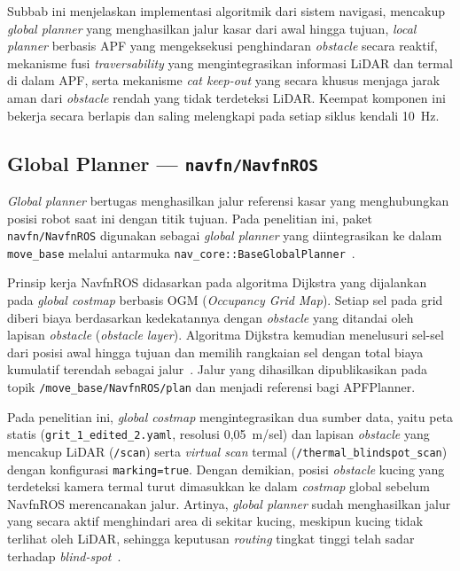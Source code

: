 Subbab ini menjelaskan implementasi algoritmik dari sistem navigasi, mencakup \textit{global planner} yang menghasilkan jalur kasar dari awal hingga tujuan, \textit{local planner} berbasis APF yang mengeksekusi penghindaran \textit{obstacle} secara reaktif, mekanisme fusi \textit{traversability} yang mengintegrasikan informasi LiDAR dan termal di dalam APF, serta mekanisme \textit{cat keep-out} yang secara khusus menjaga jarak aman dari \textit{obstacle} rendah yang tidak terdeteksi LiDAR. Keempat komponen ini bekerja secara berlapis dan saling melengkapi pada setiap siklus kendali 10~Hz.

\subsection{Global Planner — \texttt{navfn/NavfnROS}}
\label{sec:global_planner}

\textit{Global planner} bertugas menghasilkan jalur referensi kasar yang menghubungkan posisi robot saat ini dengan titik tujuan. Pada penelitian ini, paket \texttt{navfn/NavfnROS} digunakan sebagai \textit{global planner} yang diintegrasikan ke dalam \texttt{move\_base} melalui antarmuka \texttt{nav\_core::BaseGlobalPlanner}~\cite{Macenski2022}.

Prinsip kerja NavfnROS didasarkan pada algoritma Dijkstra yang dijalankan pada \textit{global costmap} berbasis OGM (\textit{Occupancy Grid Map}). Setiap sel pada grid diberi biaya berdasarkan kedekatannya dengan \textit{obstacle} yang ditandai oleh lapisan \textit{obstacle} (\textit{obstacle layer}). Algoritma Dijkstra kemudian menelusuri sel-sel dari posisi awal hingga tujuan dan memilih rangkaian sel dengan total biaya kumulatif terendah sebagai jalur~\cite{Adiuku2024}. Jalur yang dihasilkan dipublikasikan pada topik \texttt{/move\_base/NavfnROS/plan} dan menjadi referensi bagi APFPlanner.

Pada penelitian ini, \textit{global costmap} mengintegrasikan dua sumber data, yaitu peta statis (\texttt{grit\_1\_edited\_2.yaml}, resolusi 0,05~m/sel) dan lapisan \textit{obstacle} yang mencakup LiDAR (\texttt{/scan}) serta \textit{virtual scan} termal (\texttt{/thermal\_blindspot\_scan}) dengan konfigurasi \texttt{marking=true}. Dengan demikian, posisi \textit{obstacle} kucing yang terdeteksi kamera termal turut dimasukkan ke dalam \textit{costmap} global sebelum NavfnROS merencanakan jalur. Artinya, \textit{global planner} sudah menghasilkan jalur yang secara aktif menghindari area di sekitar kucing, meskipun kucing tidak terlihat oleh LiDAR, sehingga keputusan \textit{routing} tingkat tinggi telah sadar terhadap \textit{blind-spot}~\cite{Fagundes2024}.

